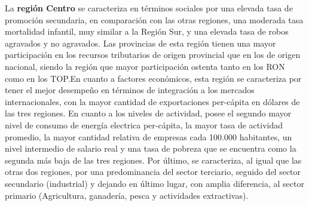 \documentclass[12pt,a4paper]{article}
\begin{document}
La \textbf{región Centro} se caracteriza en términos sociales por una elevada tasa de promoción secundaria, en comparación con las otras regiones, una moderada tasa mortalidad infantil, muy similar a la Región Sur, y una elevada tasa de robos agravados y no agravados. Las provincias de esta región tienen una mayor participación en los recursos tributarios de origen provincial que en los de origen nacional, siendo la región que mayor participación ostenta tanto en los RON como en los TOP.En cuanto a factores económicos, esta región se caracteriza por tener el mejor desempeño en términos de integración a los mercados internacionales, con la mayor cantidad de exportaciones per-cápita en dólares de las tres regiones. En cuanto a los niveles de actividad, posee el segundo mayor nivel de consumo  de energía electrica per-cápita, la mayor tasa de actividad promedio, la mayor cantidad relativa de empresas cada 100.000 habitantes, un nivel intermedio de salario real  y una tasa de pobreza que se encuentra como la segunda más baja de las tres regiones. Por último, se caracteriza, al igual que las otras dos regiones, por una predominancia del sector terciario, seguido del sector secundario (industrial) y dejando en último lugar, con amplia diferencia, al sector primario (Agricultura, ganadería, pesca y actividades extractivas).
\end{document}
